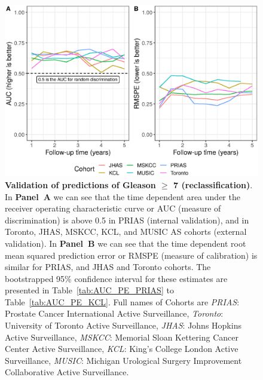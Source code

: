 \begin{figure}
\centerline{\includegraphics[width=\columnwidth]{images/auc_pe.eps}}
\caption{\textbf{Validation of predictions of Gleason $\geq$ 7 (reclassification)}. In \textbf{Panel~A} we can see that the time dependent area under the receiver operating characteristic curve or AUC (measure of discrimination) is above 0.5 in PRIAS (internal validation), and in Toronto, JHAS, MSKCC, KCL, and MUSIC AS cohorts (external validation). In \textbf{Panel~B} we can see that the time dependent root mean squared prediction error or RMSPE (measure of calibration) is similar for PRIAS, and JHAS and Toronto cohorts. The bootstrapped 95\% confidence interval for these estimates are presented in Table~\ref{tab:AUC_PE_PRIAS} to Table~\ref{tab:AUC_PE_KCL}. Full names of Cohorts are \textit{PRIAS}: Prostate Cancer International Active Surveillance, \textit{Toronto}: University of Toronto Active Surveillance, \textit{JHAS}: Johns Hopkins Active Surveillance, \textit{MSKCC}: Memorial Sloan Kettering Cancer Center Active Surveillance, \textit{KCL}: King's College London Active Surveillance, \textit{MUSIC}: Michigan Urological Surgery Improvement Collaborative Active Surveillance.}
\label{fig:auc_pe}
\end{figure}

